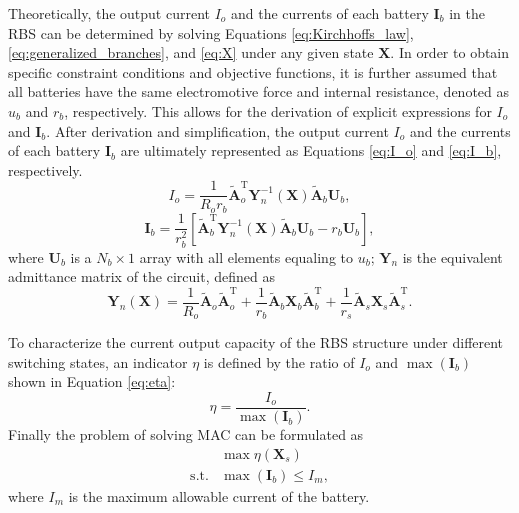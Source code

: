 \documentclass{article}
\def\T{\mathrm{T}}
\begin{document}
Theoretically, the output current $I_o$ and the currents of each battery $\bm{I}_b$ in the RBS  can be determined by solving Equations \ref{eq:Kirchhoffs_law}, \ref{eq:generalized_branches}, and \ref{eq:X} under any given state $\bm{X}$.
In order to obtain specific constraint conditions and objective functions, it is further assumed that all batteries have the same electromotive force and internal resistance, denoted as $u_b$ and $r_b$, respectively.
This allows for the derivation of explicit expressions for $I_o$ and $\bm{I}_b$.
After derivation and simplification, the output current $I_o$ and the currents of each battery $\bm{I}_b$ are ultimately represented as Equations \ref{eq:I_o} and \ref{eq:I_b}, respectively.
\begin{equation}\label{eq:I_o}
    I_o = \frac{1}{R_o r_b} \bm{\tilde{A}}_o^\T \bm{Y}_n^{-1}(\bm{X}) \bm{\tilde{A}}_b \bm{U}_b,
\end{equation}
\begin{equation}\label{eq:I_b}
    \bm{I}_b = \frac{1}{r_b^2}[\bm{\tilde{A}}_b^\T \bm{Y}_n^{-1}(\bm{X}) \bm{\tilde{A}}_b\bm{U}_b -r_b \bm{U}_b],
\end{equation}
where $\bm{U}_b$ is a $N_b\times 1$ array with all elements equaling to $u_b$;
$\bm{Y}_n$ is the equivalent admittance matrix of the circuit, defined as
\begin{equation}\label{eq:Yn}
    \bm{Y}_n (\bm{X}) = \frac{1}{R_o} \bm{\tilde{A}}_o\bm{\tilde{A}}_o^\T + \frac{1}{r_b} \bm{\tilde{A}}_b\bm{X}_b\bm{\tilde{A}}_b^\T + \frac{1}{r_s}\bm{\tilde{A}}_s\bm{X}_s\bm{\tilde{A}}_s^\T.
\end{equation}


To characterize the current output capacity of the RBS structure under different switching states, an indicator $\eta$ is defined by the ratio of $I_o$ and $\max (\bm{I}_b)$ shown in Equation \ref{eq:eta}:
\begin{equation}\label{eq:eta}
    \eta = \frac{I_o}{\max (\bm{I}_b)}.
\end{equation}
Finally the problem of solving MAC can be formulated as
\begin{align}
    & \max \eta(\bm{X}_s) \label{eq:max_eta}\\
    \text{s.t.} & \max (\bm{I}_b) \leq I_m, \label{eq:Ib_leq_Im}
\end{align}
where $I_m$ is the maximum allowable current of the battery.
\end{document}
